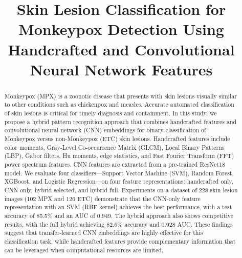 \documentclass[conference]{IEEEtran}
\begin{document}
\title{Skin Lesion Classification for Monkeypox Detection Using
Handcrafted and Convolutional Neural Network Features}

\author{
    \and
}

\maketitle

\begin{abstract}
Monkeypox (MPX) is a zoonotic disease that presents with skin lesions
visually similar to other conditions such as chickenpox and measles.
Accurate automated classification of skin lesions is critical for
timely diagnosis and containment. In this study, we propose a hybrid
pattern recognition approach that combines handcrafted features and
convolutional neural network (CNN) embeddings for binary classification
of Monkeypox versus non-Monkeypox (ETC) skin lesions. Handcrafted
features include color moments, Gray-Level Co-occurrence Matrix
(GLCM), Local Binary Patterns (LBP), Gabor filters, Hu moments, edge
statistics, and Fast Fourier Transform (FFT) power spectrum features.
CNN features are extracted from a pre-trained ResNet18 model. We
evaluate four classifiers---Support Vector Machine (SVM), Random
Forest, XGBoost, and Logistic Regression---on four feature
representations: handcrafted only, CNN only, hybrid selected, and
hybrid full. Experiments on a dataset of 228 skin lesion images
(102 MPX and 126 ETC) demonstrate that the CNN-only feature
representation with an SVM (RBF kernel) achieves the best performance,
with a test accuracy of 85.5\% and an AUC of 0.949. The hybrid
approach also shows competitive results, with the full hybrid
achieving 82.6\% accuracy and 0.928 AUC. These findings suggest that
transfer-learned CNN embeddings are highly effective for this
classification task, while handcrafted features provide complementary
information that can be leveraged when computational resources are
limited.
\end{abstract}
\end{document}
